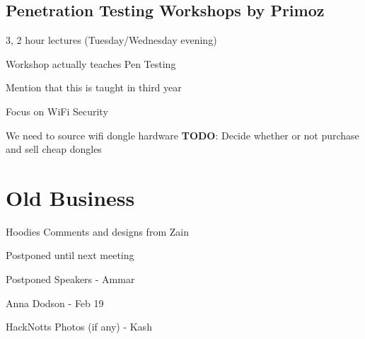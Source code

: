 \documentclass[11pt,hacksoc]{meetingmins}
\begin{document}
\subsection{Penetration Testing Workshops by Primoz}
\begin{hiddensubitems}
	\item
	
	\item
	3, 2 hour lectures (Tuesday/Wednesday evening)
	
	\item
	Workshop actually teaches Pen Testing
	
	\item
	
	\item
		\subitem
		Mention that this is taught in third year
		
	\item
	Focus on WiFi Security
	
	\item
	We need to source wifi dongle hardware
		\subitem
		\textbf{TODO}: Decide whether or not purchase and sell cheap dongles
		
		\subitem
		
	\item
	
	\item
	
\end{hiddensubitems}

\section{Old Business}
\begin{items}
	\item
	Hoodies
		\subitem
		Comments and designs from Zain
		
		\subitem
		Postponed until next meeting
		
	\item
	Postponed Speakers - Ammar
	
		\subitem
		Anna Dodson - Feb 19
			\subsubitem
		
		\subitem
		
		\subitem
		
	\item
	HackNotts Photos (if any) - Kash
		\subitem
	
	\item
	
\end{items}
\end{document}
